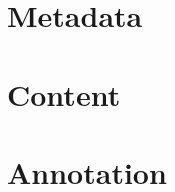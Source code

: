 \documentclass[a4paper,10pt,oneside]{scrbook}
\begin{document}
\section{Metadata}


\section{Content}


\section{Annotation}
\end{document}
